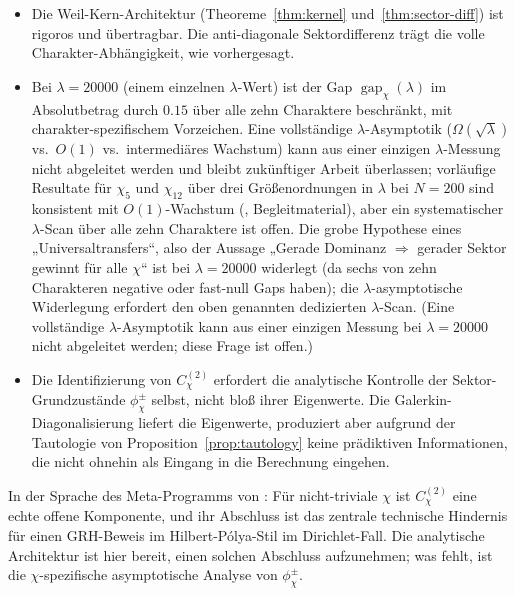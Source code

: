 \documentclass[a4paper,10pt,twocolumn]{article}
\theoremstyle{definition}
\theoremstyle{remark}
\newcommand{\gap}{\operatorname{gap}}
\newcommand{\chifn}{\chi}
\begin{document}
\begin{itemize}
  \item[(I1)] Die Weil-Kern-Architektur (Theoreme~\ref{thm:kernel}
    und~\ref{thm:sector-diff}) ist rigoros und übertragbar. Die
    anti-diagonale Sektordifferenz trägt die volle Charakter-Abhängigkeit,
    wie vorhergesagt.
  \item[(I2)] Bei $\lambda=20000$ (einem einzelnen $\lambda$-Wert) ist der
    Gap $\gap_{\chifn}(\lambda)$ im Absolutbetrag durch $0.15$ über alle
    zehn Charaktere beschränkt, mit charakter-spezifischem Vorzeichen.
    Eine vollständige $\lambda$-Asymptotik ($\Omega(\sqrt{\lambda})$
    vs.\ $O(1)$ vs.\ intermediäres Wachstum) kann aus einer einzigen
    $\lambda$-Messung nicht abgeleitet werden und bleibt zukünftiger
    Arbeit überlassen; vorläufige Resultate für $\chifn_5$ und
    $\chifn_{12}$ über drei Größenordnungen in $\lambda$ bei $N=200$ sind
    konsistent mit $O(1)$-Wachstum (\cite{AsymptoticScan},
    Begleitmaterial), aber ein systematischer $\lambda$-Scan über alle
    zehn Charaktere ist offen. Die grobe
    Hypothese eines „Universaltransfers“, also der Aussage
    „Gerade Dominanz $\Rightarrow$ gerader Sektor gewinnt für alle
    $\chifn$“ ist bei $\lambda=20000$ widerlegt (da sechs von zehn
    Charakteren negative oder fast-null Gaps haben); die
    $\lambda$-asymptotische Widerlegung erfordert den oben genannten
    dedizierten $\lambda$-Scan. (Eine vollständige $\lambda$-Asymptotik
    kann aus einer einzigen Messung bei $\lambda=20000$ nicht abgeleitet
    werden; diese Frage ist offen.)
  \item[(I3)] Die Identifizierung von $C^{(2)}_{\chifn}$ erfordert die analytische
    Kontrolle der Sektor-Grundzustände $\phi^\pm_{\chifn}$
    selbst, nicht bloß ihrer Eigenwerte. Die Galerkin-Diagonalisierung
    liefert die Eigenwerte, produziert aber aufgrund der Tautologie
    von Proposition~\ref{prop:tautology} keine prädiktiven
    Informationen, die nicht ohnehin als Eingang in die Berechnung eingehen.
\end{itemize}

In der Sprache des Meta-Programms von \cite{MetaGalerkinBridge}: Für
nicht-triviale $\chifn$ ist $C^{(2)}_{\chifn}$ eine echte offene
Komponente, und ihr Abschluss ist das zentrale technische Hindernis für einen
GRH-Beweis im Hilbert-P\'olya-Stil im Dirichlet-Fall. Die
analytische Architektur ist hier bereit, einen solchen Abschluss aufzunehmen; was
fehlt, ist die $\chifn$-spezifische asymptotische Analyse von
$\phi^\pm_{\chifn}$.
\end{document}
